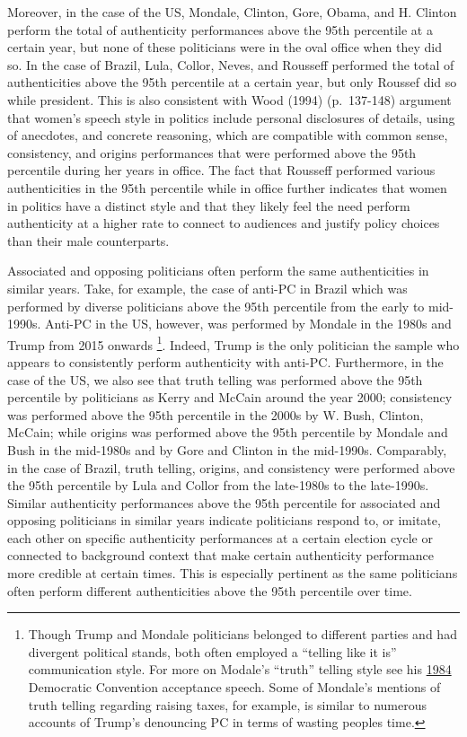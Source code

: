 \documentclass[smallextended]{svjour3}       %
\begin{document}
Moreover, in the case of the US, Mondale, Clinton, Gore, Obama, and H.
Clinton perform the total of authenticity performances above the 95th
percentile at a certain year, but none of these politicians were in the
oval office when they did so. In the case of Brazil, Lula, Collor,
Neves, and Rousseff performed the total of authenticities above the 95th
percentile at a certain year, but only Roussef did so while president.
This is also consistent with Wood (1994) (p.~137-148) argument that
women's speech style in politics include personal disclosures of
details, using of anecdotes, and concrete reasoning, which are
compatible with common sense, consistency, and origins performances that
were performed above the 95th percentile during her years in office. The
fact that Rousseff performed various authenticities in the 95th
percentile while in office further indicates that women in politics have
a distinct style and that they likely feel the need perform authenticity
at a higher rate to connect to audiences and justify policy choices than
their male counterparts.

Associated and opposing politicians often perform the same
authenticities in similar years. Take, for example, the case of anti-PC
in Brazil which was performed by diverse politicians above the 95th
percentile from the early to mid-1990s. Anti-PC in the US, however, was
performed by Mondale in the 1980s and Trump from 2015 onwards
\footnote{Though Trump and Mondale politicians belonged to different
  parties and had divergent political stands, both often employed a
  ``telling like it is'' communication style. For more on Modale's
  ``truth'' telling style see his
  \href{https://www.nytimes.com/1984/07/20/us/transcript-of-mondale-address-accepting-party-nomination.html}{1984}
  Democratic Convention acceptance speech. Some of Mondale's mentions of
  truth telling regarding raising taxes, for example, is similar to
  numerous accounts of Trump's denouncing PC in terms of wasting peoples
  time.}. Indeed, Trump is the only politician the sample who appears to
consistently perform authenticity with anti-PC. Furthermore, in the case
of the US, we also see that truth telling was performed above the 95th
percentile by politicians as Kerry and McCain around the year 2000;
consistency was performed above the 95th percentile in the 2000s by W.
Bush, Clinton, McCain; while origins was performed above the 95th
percentile by Mondale and Bush in the mid-1980s and by Gore and Clinton
in the mid-1990s. Comparably, in the case of Brazil, truth telling,
origins, and consistency were performed above the 95th percentile by
Lula and Collor from the late-1980s to the late-1990s. Similar
authenticity performances above the 95th percentile for associated and
opposing politicians in similar years indicate politicians respond to,
or imitate, each other on specific authenticity performances at a
certain election cycle or connected to background context that make
certain authenticity performance more credible at certain times. This is
especially pertinent as the same politicians often perform different
authenticities above the 95th percentile over time.
\end{document}
